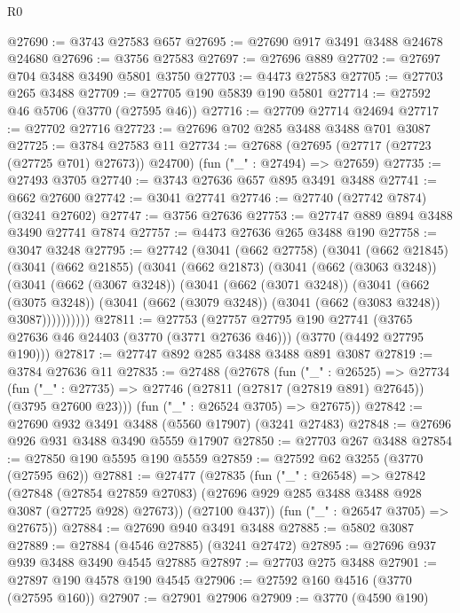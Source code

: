 \begin{lexlean}{R0}
\begin{coremodule}
@27690 := @3743 @27583 @657
@27695 := @27690 @917 @3491 @3488 @24678 @24680
@27696 := @3756 @27583
@27697 := @27696 @889
@27702 := @27697 @704 @3488 @3490 @5801 @3750
@27703 := @4473 @27583
@27705 := @27703 @265 @3488
@27709 := @27705 @190 @5839 @190 @5801
@27714 := @27592 @46 @5706 (@3770 (@27595 @46))
@27716 := @27709 @27714 @24694
@27717 := @27702 @27716
@27723 := @27696 @702 @285 @3488 @3488 @701 @3087
@27725 := @3784 @27583 @11
@27734 := @27688
    (@27695 (@27717 (@27723 (@27725 @701) @27673)) @24700)
    (fun ("_" : @27494) => @27659)
@27735 := @27493 @3705
@27740 := @3743 @27636 @657 @895 @3491 @3488
@27741 := @662 @27600
@27742 := @3041 @27741
@27746 := @27740 (@27742 @7874) (@3241 @27602)
@27747 := @3756 @27636
@27753 := @27747 @889 @894 @3488 @3490 @27741 @7874
@27757 := @4473 @27636 @265 @3488 @190
@27758 := @3047 @3248
@27795 := @27742
    (@3041
      (@662 @27758)
      (@3041
        (@662 @21845)
        (@3041
          (@662 @21855)
          (@3041
            (@662 @21873)
            (@3041
              (@662 (@3063 @3248))
              (@3041
                (@662 (@3067 @3248))
                (@3041
                  (@662 (@3071 @3248))
                  (@3041
                    (@662 (@3075 @3248))
                    (@3041 (@662 (@3079 @3248)) (@3041 (@662 (@3083 @3248)) @3087))))))))))
@27811 := @27753
    (@27757
      @27795
      @190
      @27741
      (@3765 @27636 @46 @24403 (@3770 (@3771 @27636 @46)))
      (@3770 (@4492 @27795 @190)))
@27817 := @27747 @892 @285 @3488 @3488 @891 @3087
@27819 := @3784 @27636 @11
@27835 := @27488
    (@27678
      (fun ("_" : @26525) =>
      @27734
        (fun ("_" : @27735) => @27746 (@27811 (@27817 (@27819 @891) @27645)) (@3795 @27600 @23)))
      (fun ("_" : @26524 @3705) => @27675))
@27842 := @27690 @932 @3491 @3488 (@5560 @17907) (@3241 @27483)
@27848 := @27696 @926 @931 @3488 @3490 @5559 @17907
@27850 := @27703 @267 @3488
@27854 := @27850 @190 @5595 @190 @5559
@27859 := @27592 @62 @3255 (@3770 (@27595 @62))
@27881 := @27477
    (@27835
      (fun ("_" : @26548) =>
      @27842
        (@27848
          (@27854 @27859 @27083)
          (@27696 @929 @285 @3488 @3488 @928 @3087 (@27725 @928) @27673))
        (@27100 @437))
      (fun ("_" : @26547 @3705) => @27675))
@27884 := @27690 @940 @3491 @3488
@27885 := @5802 @3087
@27889 := @27884 (@4546 @27885) (@3241 @27472)
@27895 := @27696 @937 @939 @3488 @3490 @4545 @27885
@27897 := @27703 @275 @3488
@27901 := @27897 @190 @4578 @190 @4545
@27906 := @27592 @160 @4516 (@3770 (@27595 @160))
@27907 := @27901 @27906
@27909 := @3770 (@4590 @190)

\end{coremodule}
\end{lexlean}
